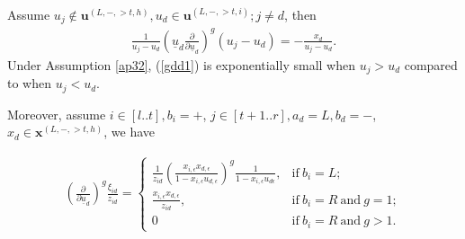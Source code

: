 \documentclass[11pt]{amsart}
\theoremstyle{plain}
\theoremstyle{definition}
\theoremstyle{remark}
\numberwithin{equation}{section}
\numberwithin{theorem}{section}
\numberwithin{figure}{section}
\begin{document}
Assume $u_{j}\notin \mathbf{u}^{(L,-,>t,h)},u_d\in \mathbf{u}^{(L,-,>t,i)};j\neq d$, then
\begin{align}
\frac{1}{u_j-u_d}\left(\underline{u}_d\frac{\partial}{\partial\underline{u}_d}\right)^g (u_j-u_d)=-\frac{x_d}{u_j-u_d}.\label{gdd1}
\end{align}
Under Assumption \ref{ap32}, (\ref{gdd1}) is exponentially small when $u_j>u_d$ compared to when $u_j<u_d$.


Moreover, assume $i\in[l..t],b_i=+$, $j\in[t+1..r],a_d=L,b_d=-$, $x_d\in \mathbf{x}^{(L,-,>t,h)}$, we have

\begin{align*}
\left(\frac{\partial}{\partial\underline{u}_d}\right)^{g}\frac{\xi_{id}}{z_{id}}=
\begin{cases}
 \frac{1}{z_{id}}\left(\frac{x_{i,\epsilon}x_{d,\epsilon}}{1-x_{i,\epsilon}u_{d,\epsilon}}\right)^g\frac{1}{1-x_{i,\epsilon}u_{d\epsilon}}, &\mathrm{if}\ b_i=L;\\
\frac{x_{i,\epsilon}x_{d,\epsilon}}{z_{id}},&\mathrm{if}\ b_i=R\ \mathrm{and}\ g=1;\\
0&\mathrm{if}\ b_i=R\ \mathrm{and}\ g>1.
\end{cases}
\end{align*}
\end{document}
